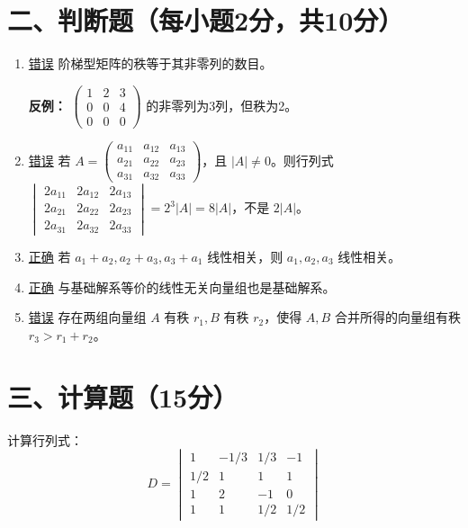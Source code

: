 \documentclass[lang=cn,12pt]{elegantbook}
\begin{document}
\section*{二、判断题（每小题2分，共10分）}

\begin{example}
    \begin{enumerate}
    \item \underline{错误} 阶梯型矩阵的秩等于其非零列的数目。
    
    \textbf{反例：} 
    $\begin{pmatrix}
    1 & 2 & 3 \\
    0 & 0 & 4 \\
    0 & 0 & 0
    \end{pmatrix}$ 的非零列为3列，但秩为2。
    
    \item \underline{错误} 若 $A = \begin{pmatrix} 
    a_{11} & a_{12} & a_{13} \\ 
    a_{21} & a_{22} & a_{23} \\ 
    a_{31} & a_{32} & a_{33} 
    \end{pmatrix}$，且 $|A| \neq 0$。则行列式
    $\begin{vmatrix} 
    2a_{11} & 2a_{12} & 2a_{13} \\ 
    2a_{21} & 2a_{22} & 2a_{23} \\ 
    2a_{31} & 2a_{32} & 2a_{33} 
    \end{vmatrix} = 2^3|A| = 8|A|$，不是 $2|A|$。
    
    \item \underline{正确} 若 $a_1 + a_2, a_2 + a_3, a_3 + a_1$ 线性相关，则 $a_1, a_2, a_3$ 线性相关。
    
    \item \underline{正确} 与基础解系等价的线性无关向量组也是基础解系。
    
    \item \underline{错误} 存在两组向量组 $A$ 有秩 $r_1, B$ 有秩 $r_2$，使得 $A, B$ 合并所得的向量组有秩 $r_3 > r_1 + r_2$。
    \end{enumerate}
\end{example}

\section*{三、计算题（15分）}

\begin{example}
计算行列式：
\[
D = \begin{vmatrix}
1 & -1/3 & 1/3 & -1 \\
1/2 & 1 & 1 & 1 \\
1 & 2 & -1 & 0 \\
1 & 1 & 1/2 & 1/2
\end{vmatrix}
\]
\end{example}
\end{document}
